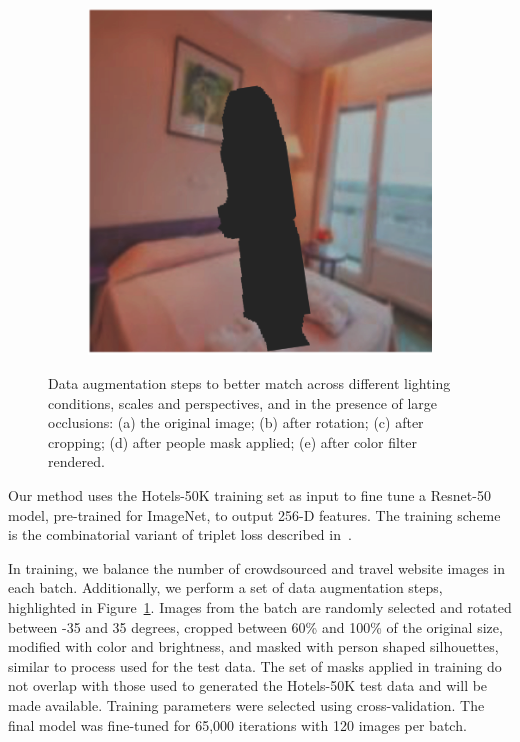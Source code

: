 \begin{figure}
\begin{subfigure}[b]{.19\columnwidth}
        \caption{}
    \end{subfigure}
    \begin{subfigure}[b]{.19\columnwidth}
        \centering
        \includegraphics[width=.98\columnwidth]{figures/chapter4/data_augmentation/5.png}
        \caption{}
    \end{subfigure}
    \caption[Data augmentation to mimic properties of query images.]{Data augmentation steps to better match across different lighting conditions, scales and perspectives, and in the presence of large occlusions: (a) the original image; (b) after rotation; (c) after cropping; (d) after people mask applied; (e) after color filter rendered.}
    \label{fig:data_augmentation}
\end{figure}

Our method uses the Hotels-50K training set as input
to fine tune a Resnet-50 model, pre-trained for ImageNet, to output 256-D features. The training scheme is the  combinatorial variant of triplet loss described in~\cite{HermansBeyer2017Arxiv}.

In training, we balance the number of crowdsourced and travel website images in each batch. Additionally, we perform a set of data augmentation steps, highlighted in Figure~\ref{fig:data_augmentation}. Images from the batch are randomly selected and rotated between -35 and 35 degrees, cropped between 60\% and 100\% of the original size, modified with color and brightness, and masked with person shaped silhouettes, similar to process used for the test data. The set of masks applied in training do not overlap with those used to generated the Hotels-50K test data and will be made available. Training parameters
were selected using cross-validation. The final model
was fine-tuned for 65,000 iterations with 120 images per batch.

